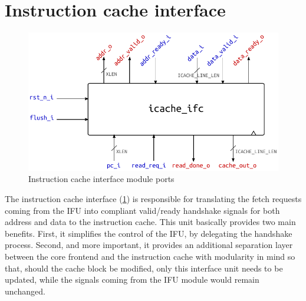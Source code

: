 \section{Instruction cache interface}
\begin{figure}[hbt]
  \centering
  \includegraphics{img/icache_ifc-top.pdf}
  \caption{Instruction cache interface module ports}
  \label{fig:icache_ifc-top}
\end{figure}
The instruction cache interface (\cref{fig:icache_ifc-top}) is responsible for translating the fetch requests coming from the \ac{IFU} into compliant valid/ready handshake signals for both address and data to the instruction cache. This unit basically provides two main benefits. First, it simplifies the control of the \ac{IFU}, by delegating the handshake process. Second, and more important, it provides an additional separation layer between the core frontend and the instruction cache with modularity in mind so that, should the cache block be modified, only this interface unit needs to be updated, while the signals coming from the \ac{IFU} module would remain unchanged.

